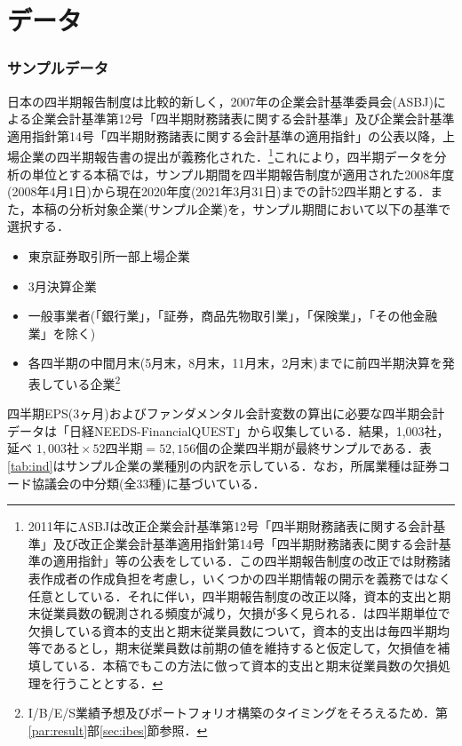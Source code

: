 \documentclass[a4paper，11pt]{jsarticle}
\begin{document}
\part{データ} \label{par:data}

\section{サンプルデータ} \label{sec:sample}

日本の四半期報告制度は比較的新しく，2007年の企業会計基準委員会(ASBJ)による企業会計基準第12号「四半期財務諸表に関する会計基準」及び企業会計基準適用指針第14号「四半期財務諸表に関する会計基準の適用指針」の公表以降，上場企業の四半期報告書の提出が義務化された．\footnote{2011年にASBJは改正企業会計基準第12号「四半期財務諸表に関する会計基準」及び改正企業会計基準適用指針第14号「四半期財務諸表に関する会計基準の適用指針」等の公表をしている．この四半期報告制度の改正では財務諸表作成者の作成負担を考慮し，いくつかの四半期情報の開示を義務ではなく任意としている．それに伴い，四半期報告制度の改正以降，資本的支出と期末従業員数の観測される頻度が減り，欠損が多く見られる．\cite{zhang2004neural}は四半期単位で欠損している資本的支出と期末従業員数について，資本的支出は毎四半期均等であるとし，期末従業員数は前期の値を維持すると仮定して，欠損値を補填している．本稿でもこの方法に倣って資本的支出と期末従業員数の欠損処理を行うこととする．}これにより，四半期データを分析の単位とする本稿では，サンプル期間を四半期報告制度が適用された2008年度(2008年4月1日)から現在2020年度(2021年3月31日)までの計52四半期とする．また，本稿の分析対象企業(サンプル企業)を，サンプル期間において以下の基準で選択する．

\begin{itemize}
  \item 東京証券取引所一部上場企業
  \item 3月決算企業
  \item 一般事業者(「銀行業」，「証券，商品先物取引業」，「保険業」，「その他金融業」を除く)
  \item 各四半期の中間月末(5月末，8月末，11月末，2月末)までに前四半期決算を発表している企業\footnote{I/B/E/S業績予想及びポートフォリオ構築のタイミングをそろえるため．第\ref{par:result}部\ref{sec:ibes}節参照．}
\end{itemize}

四半期EPS(3ヶ月)およびファンダメンタル会計変数の算出に必要な四半期会計データは「日経NEEDS-FinancialQUEST」から収集している．結果，1,003社，延べ $1,003社 \times 52四半期 = 52,156個$の企業四半期が最終サンプルである．表\ref{tab:ind}はサンプル企業の業種別の内訳を示している．なお，所属業種は証券コード協議会の中分類(全33種)に基づいている．
\end{document}

